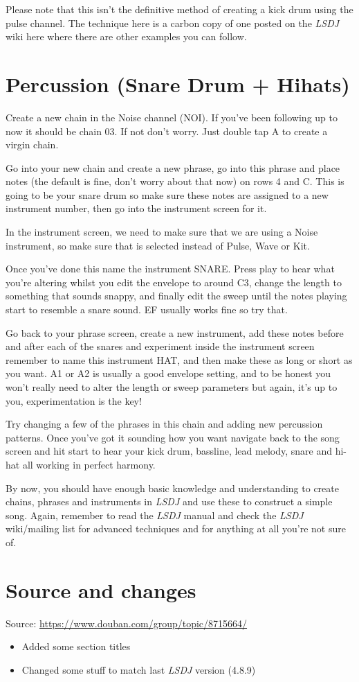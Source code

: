 \documentclass[]{article}
\newcommand{\lsdj}{\textit{LSDJ}\xspace}
\begin{document}
Please note that this isn't the definitive method of creating a kick drum using the pulse channel. The technique here is a carbon copy of one posted on the \lsdj wiki here where there are other examples you can follow.

\section{Percussion (Snare Drum + Hihats)}
Create a new chain in the Noise channel (NOI). If you've been following up to now it should be chain 03. If not don't worry. Just double tap A to create a virgin chain.

Go into your new chain and create a new phrase, go into this phrase and place notes (the default is fine, don't worry about that now) on rows 4 and C. This is going to be your snare drum so make sure these notes are assigned to a new instrument number, then go into the instrument screen for it.

In the instrument screen, we need to make sure that we are using a Noise instrument, so make sure that is selected instead of Pulse, Wave or Kit.

Once you've done this name the instrument SNARE. Press play to hear what you're altering whilst you edit the envelope to around C3, change the length to something that sounds snappy, and finally edit the sweep until the notes playing start to resemble a snare sound. EF usually works fine so try that.

Go back to your phrase screen, create a new instrument, add these notes before and after each of the snares and experiment inside the instrument screen remember to name this instrument HAT, and then make these as long or short as you want. A1 or A2 is usually a good envelope setting, and to be honest you won't really need to alter the length or sweep parameters but again, it's up to you, experimentation is the key!

Try changing a few of the phrases in this chain and adding new percussion patterns. Once you've got it sounding how you want navigate back to the song screen and hit start to hear your kick drum, bassline, lead melody, snare and hi-hat all working in perfect harmony.

By now, you should have enough basic knowledge and understanding to create chains, phrases and instruments in \lsdj and use these to construct a simple song. Again, remember to read the \lsdj manual and check the \lsdj wiki/mailing list for advanced techniques and for anything at all you're not sure of.


\section*{Source and changes}

Source: \url{https://www.douban.com/group/topic/8715664/}

\begin{itemize}
	\item Added some section titles
	\item Changed some stuff to match last \lsdj version (4.8.9)
\end{itemize}
\end{document}
